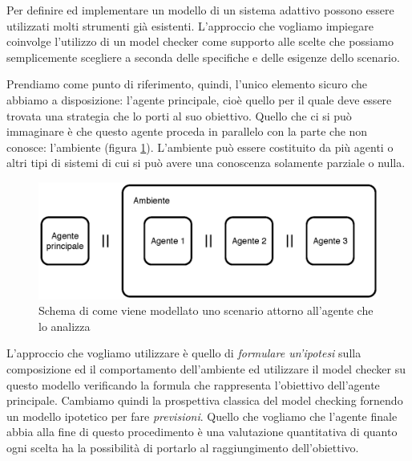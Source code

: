 


Per definire ed implementare un modello di un sistema adattivo possono essere utilizzati molti strumenti già esistenti. L'approccio che vogliamo impiegare coinvolge l'utilizzo di un model checker come supporto alle scelte che possiamo semplicemente scegliere a seconda delle specifiche e delle esigenze dello scenario.

Prendiamo come punto di riferimento, quindi, l'unico elemento sicuro che abbiamo a disposizione: l'agente principale, cioè quello per il quale deve essere trovata una strategia che lo porti al suo obiettivo. Quello che ci si può immaginare è che questo agente proceda in parallelo con la parte che non conosce: l'ambiente (figura \ref{fig:lapsa:schemaidea}). L'ambiente può essere costituito da più agenti o altri tipi di sistemi di cui si può avere una conoscenza solamente parziale o nulla.
\begin{figure}[htbp!]
	\begin{center}
		\includegraphics[width=.8\textwidth]{Images/schemaidea}
	\end{center}
	\caption{Schema di come viene modellato uno scenario attorno all'agente che lo analizza}
	\label{fig:lapsa:schemaidea}
\end{figure}

L'approccio che vogliamo utilizzare è quello di \emph{formulare un'ipotesi} sulla composizione ed il comportamento dell'ambiente ed utilizzare il model checker su questo modello verificando la formula che rappresenta l'obiettivo dell'agente principale. Cambiamo quindi la prospettiva classica del model checking fornendo un modello ipotetico per fare \emph{previsioni}. Quello che vogliamo che l'agente finale abbia alla fine di questo procedimento è una valutazione quantitativa di quanto ogni scelta ha la possibilità di portarlo al raggiungimento dell'obiettivo.

